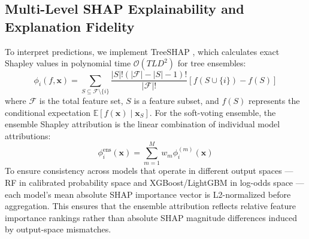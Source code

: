 \documentclass[journal]{IEEEtran}
\begin{document}
\subsection{Multi-Level SHAP Explainability and Explanation Fidelity}
To interpret predictions, we implement TreeSHAP \cite{lundberg2020local}, which calculates exact Shapley values in polynomial time $\mathcal{O}(T L D^2)$ for tree ensembles:
\begin{equation}
\phi_i(f, \mathbf{x}) = \sum_{S \subseteq \mathcal{F} \setminus \{i\}} \frac{|S|!(|\mathcal{F}| - |S| - 1)!}{|\mathcal{F}|!} \left[ f(S \cup \{i\}) - f(S) \right]
\label{eq:shapley}
\end{equation}
where $\mathcal{F}$ is the total feature set, $S$ is a feature subset, and $f(S)$ represents the conditional expectation $\mathbb{E}[f(\mathbf{x}) \mid \mathbf{x}_S]$. For the soft-voting ensemble, the ensemble Shapley attribution is the linear combination of individual model attributions:
\begin{equation}
\phi_i^{\text{ens}}(\mathbf{x}) = \sum_{m=1}^M w_m \phi_i^{(m)}(\mathbf{x})
\label{eq:ensemble_shap}
\end{equation}
To ensure consistency across models that operate in different output spaces --- RF in calibrated probability space and XGBoost/LightGBM in log-odds space --- each model's mean absolute SHAP importance vector is L2-normalized before aggregation. This ensures that the ensemble attribution reflects relative feature importance rankings rather than absolute SHAP magnitude differences induced by output-space mismatches.
\end{document}
